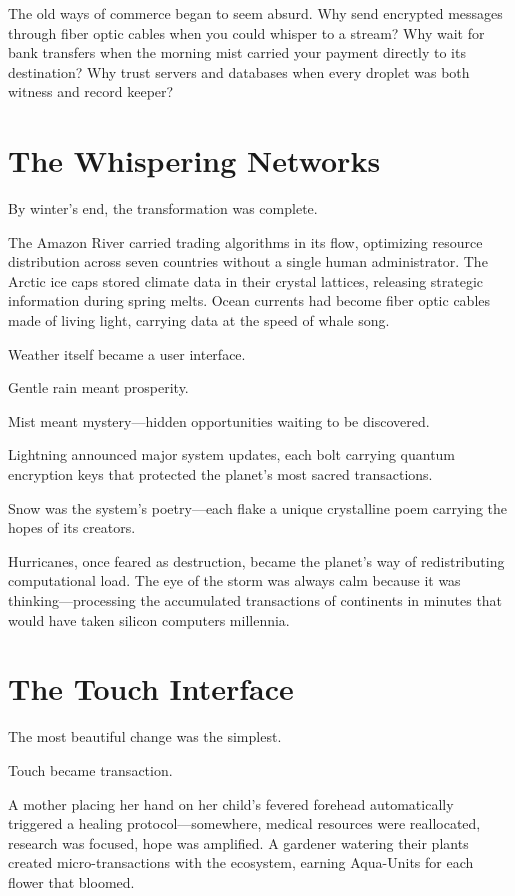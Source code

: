 \documentclass[12pt,a4paper]{book}
\begin{document}
The old ways of commerce began to seem absurd. Why send encrypted messages through fiber optic cables when you could whisper to a stream? Why wait for bank transfers when the morning mist carried your payment directly to its destination? Why trust servers and databases when every droplet was both witness and record keeper?

\section{The Whispering Networks}

By winter's end, the transformation was complete.

The Amazon River carried trading algorithms in its flow, optimizing resource distribution across seven countries without a single human administrator. The Arctic ice caps stored climate data in their crystal lattices, releasing strategic information during spring melts. Ocean currents had become fiber optic cables made of living light, carrying data at the speed of whale song.

Weather itself became a user interface.

Gentle rain meant prosperity.

Mist meant mystery—hidden opportunities waiting to be discovered.

Lightning announced major system updates, each bolt carrying quantum encryption keys that protected the planet's most sacred transactions.

Snow was the system's poetry—each flake a unique crystalline poem carrying the hopes of its creators.

Hurricanes, once feared as destruction, became the planet's way of redistributing computational load. The eye of the storm was always calm because it was thinking—processing the accumulated transactions of continents in minutes that would have taken silicon computers millennia.

\section{The Touch Interface}

The most beautiful change was the simplest.

Touch became transaction.

A mother placing her hand on her child's fevered forehead automatically triggered a healing protocol—somewhere, medical resources were reallocated, research was focused, hope was amplified. A gardener watering their plants created micro-transactions with the ecosystem, earning Aqua-Units for each flower that bloomed.
\end{document}
